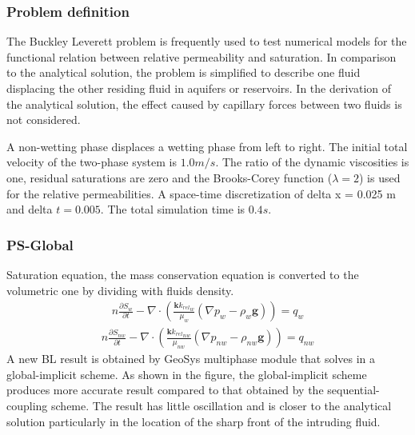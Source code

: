 \subsubsection*{\upshape\textbf{Problem definition}}
\hspace*{0.25cm} The Buckley Leverett problem is frequently used to test numerical models for the functional relation between relative permeability and saturation. In comparison to the analytical solution, the problem is simplified to describe one fluid displacing the other residing fluid in aquifers or reservoirs. In the derivation of the analytical solution, the effect caused by capillary forces between two fluids is not considered.

\hspace*{0.25cm} A non-wetting phase displaces a wetting phase from left to right. The initial total velocity of the two-phase system is $1.0 m/s$. The ratio of the dynamic viscosities is one, residual saturations are zero and the Brooks-Corey function ($\lambda = 2$) is used for the relative permeabilities. A space-time discretization of delta x = 0.025 m and delta $t = 0.005$. The total simulation time is $0.4 s$.
\subsubsection*{\upshape\textbf{PS-Global}}
\hspace*{0.25cm} Saturation equation, the mass conservation equation is converted to the volumetric one by dividing with fluids density.
\begin{align}
n\frac{{\partial S_{w}}}{{\partial t }} -
\nabla \cdot \left({\frac{{\mathbf k {k_{rel}}_w }}{{\mu_w }}\left( {\nabla p_w - \rho _w
\mathbf g} \right)} \right) = q_w
\label{eq:w_eqn}
\end{align}
\begin{align}
n\frac{{\partial S_{nw}}}{{\partial t }} -
\nabla \cdot \left({\frac{{\mathbf k {k_{rel}}_{nw} }}{{\mu_{nw} }}\left( {\nabla p_{nw} - \rho _{nw}\mathbf g} \right)} \right) = q_{nw}
\label{eq:nw_eqn}
\end{align}
A new BL result is obtained by GeoSys multiphase module that solves in a global-implicit scheme. As shown in the figure, the global-implicit scheme produces more accurate result compared to that obtained by the sequential-coupling scheme. The result has little oscillation and is closer to the analytical solution particularly in the location of the sharp front of the intruding fluid.


